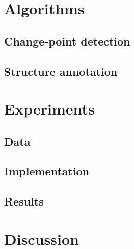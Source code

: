\documentclass{article}
\begin{document}
\section{Algorithms}

\subsection{Change-point detection}


\subsection{Structure annotation}

\section{Experiments}

\subsection{Data}

\subsection{Implementation}

\subsection{Results}

\section{Discussion}


\end{document}
